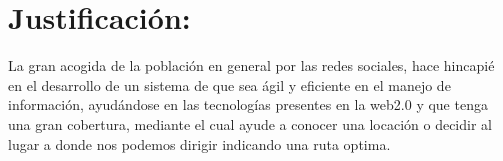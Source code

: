   \section{Justificación:} %
  \label{sec:justificacion}
    La gran acogida de la población en general por las redes sociales, hace 
    hincapié en el desarrollo de un sistema de  que sea ágil y eficiente en el 
    manejo de información, ayudándose en las tecnologías  presentes en la web2.0 y 
    que tenga una gran cobertura, mediante el cual  ayude a conocer una locaci\'on  o 
    decidir al lugar a donde nos podemos dirigir indicando una ruta optima.



  
  
  





  

